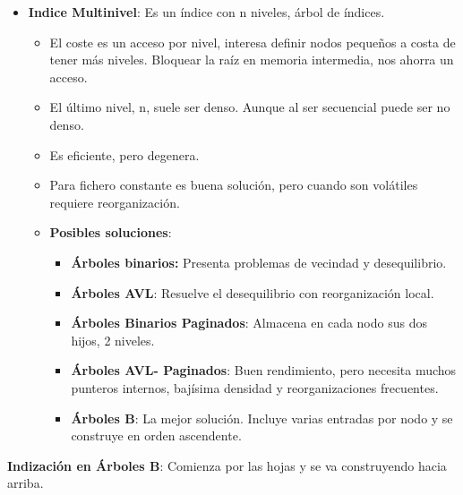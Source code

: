 \documentclass[12pt, twoside, openright]{report} %
\begin{document}
\begin{itemize}
\begin{itemize}
\begin{itemize}
      \end{itemize}
    \end{itemize}
	\pagebreak
  \item \textbf{Indice Multinivel}: Es un índice con n niveles, árbol de
    índices.
    

    \begin{itemize}
    \item El coste es un acceso por nivel, interesa definir nodos pequeños a
      costa de tener más niveles. Bloquear la raíz en memoria
      intermedia, nos ahorra un acceso.
      
    \item El último nivel, n, suele ser denso. Aunque al ser secuencial
      puede ser no denso.
      
    \item Es eficiente, pero degenera.
      
    \item Para fichero constante es buena solución, pero cuando son
      volátiles requiere reorganización.
      
    \item \textbf{Posibles soluciones}:
      

      \begin{itemize}
      \item \textbf{Árboles binarios:} Presenta problemas de vecindad y
        desequilibrio.
        
      \item \textbf{Árboles AVL}: Resuelve el desequilibrio con
        reorganización local.
        
      \item \textbf{Árboles Binarios Paginados}: Almacena en cada nodo sus
        dos hijos, 2 niveles.
        
      \item \textbf{Árboles AVL- Paginados}: Buen rendimiento, pero necesita
        muchos punteros internos, bajísima densidad y reorganizaciones
        frecuentes.
        
      \item \textbf{Árboles B}: La mejor solución. Incluye varias entradas
        por nodo y se construye en orden ascendente.
        
      \end{itemize}
    \end{itemize}
  \end{itemize}

  
  \textbf{Indización en Árboles B}: Comienza por las hojas y se va
  construyendo hacia arriba.
  
\end{document}
